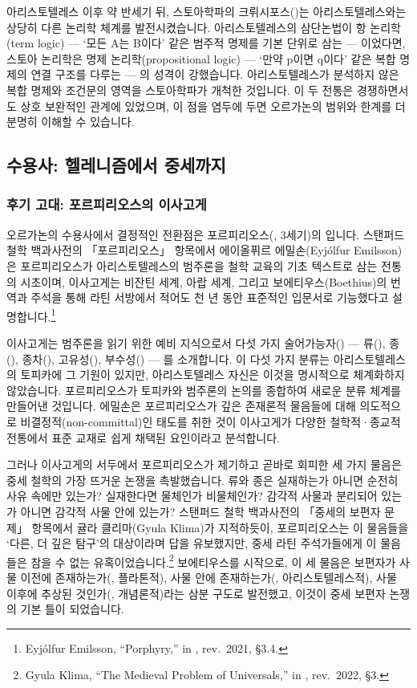 \documentclass[12pt, a4paper]{article}
\begin{document}
아리스토텔레스 이후 약 반세기 뒤, 스토아학파의 크뤼시포스()는 아리스토텔레스와는 상당히 다른 논리학 체계를 발전시켰습니다. 아리스토텔레스의 삼단논법이 항 논리학(term logic) --- `모든 A는 B이다' 같은 범주적 명제를 기본 단위로 삼는 --- 이었다면, 스토아 논리학은 명제 논리학(propositional logic) --- `만약 p이면 q이다' 같은 복합 명제의 연결 구조를 다루는 --- 의 성격이 강했습니다. 아리스토텔레스가 분석하지 않은 복합 명제와 조건문의 영역을 스토아학파가 개척한 것입니다. 이 두 전통은 경쟁하면서도 상호 보완적인 관계에 있었으며, 이 점을 염두에 두면 오르가논의 범위와 한계를 더 분명히 이해할 수 있습니다.

\subsection{수용사: 헬레니즘에서 중세까지}

\subsubsection{후기 고대: 포르피리오스의 이사고게}

오르가논의 수용사에서 결정적인 전환점은 포르피리오스(, 3세기)의 입니다. 스탠퍼드 철학 백과사전의 「포르피리오스」 항목에서 에이올퓌르 에밀손(Eyjólfur Emilsson)은 포르피리오스가 아리스토텔레스의 범주론을 철학 교육의 기초 텍스트로 삼는 전통의 시초이며, 이사고게는 비잔틴 세계, 아랍 세계, 그리고 보에티우스(Boethius)의 번역과 주석을 통해 라틴 서방에서 적어도 천 년 동안 표준적인 입문서로 기능했다고 설명합니다.\footnote{Eyjólfur Emilsson, ``Porphyry,'' in , rev.\ 2021, §3.4.}

이사고게는 범주론을 읽기 위한 예비 지식으로서 다섯 가지 술어가능자() --- 류(), 종(), 종차(), 고유성(), 부수성() --- 를 소개합니다. 이 다섯 가지 분류는 아리스토텔레스의 토피카에 그 기원이 있지만, 아리스토텔레스 자신은 이것을 명시적으로 체계화하지 않았습니다. 포르피리오스가 토피카와 범주론의 논의를 종합하여 새로운 분류 체계를 만들어낸 것입니다. 에밀손은 포르피리오스가 깊은 존재론적 물음들에 대해 의도적으로 비결정적(non-committal)인 태도를 취한 것이 이사고게가 다양한 철학적·종교적 전통에서 표준 교재로 쉽게 채택된 요인이라고 분석합니다.

그러나 이사고게의 서두에서 포르피리오스가 제기하고 곧바로 회피한 세 가지 물음은 중세 철학의 가장 뜨거운 논쟁을 촉발했습니다. 류와 종은 실재하는가 아니면 순전히 사유 속에만 있는가? 실재한다면 물체인가 비물체인가? 감각적 사물과 분리되어 있는가 아니면 감각적 사물 안에 있는가? 스탠퍼드 철학 백과사전의 「중세의 보편자 문제」 항목에서 귤라 클리마(Gyula Klima)가 지적하듯이, 포르피리오스는 이 물음들을 `다른, 더 깊은 탐구'의 대상이라며 답을 유보했지만, 중세 라틴 주석가들에게 이 물음들은 참을 수 없는 유혹이었습니다.\footnote{Gyula Klima, ``The Medieval Problem of Universals,'' in , rev.\ 2022, §3.} 보에티우스를 시작으로, 이 세 물음은 보편자가 사물 이전에 존재하는가(, 플라톤적), 사물 안에 존재하는가(, 아리스토텔레스적), 사물 이후에 추상된 것인가(, 개념론적)라는 삼분 구도로 발전했고, 이것이 중세 보편자 논쟁의 기본 틀이 되었습니다.
\end{document}
